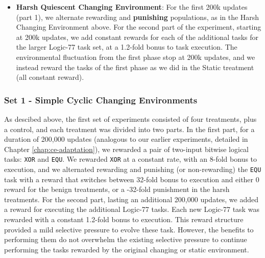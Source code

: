 \documentclass[PhD]{msu-thesis}
\begin{document}
\begin{itemize}
	\item \textbf{Harsh Quiescent Changing Environment}: For the first 200k updates (part 1), we alternate rewarding and \textbf{punishing} populations, as in the Harsh Changing Environment above. For the second part of the experiment, starting at 200k updates, we add constant rewards for each of the additional tasks for the larger Logic-77 task set, at a 1.2-fold bonus to task execution. The environmental fluctuation from the first phase stop at 200k updates, and we instead reward the tasks of the first phase as we did in the Static treatment (all constant reward).
\end{itemize}

\subsubsection{Set 1 - Simple Cyclic Changing Environments}
As descibed above, the first set of experiments consisted of four treatments, plus a control, and each treatment was divided into two parts. In the first part, for a duration of 200,000 updates (analogous to our earlier experiments, detailed in Chapter \ref{chap:ce-adaptation}), we rewarded a pair of two-input bitwise logical tasks: \texttt{XOR} and \texttt{EQU}. We rewarded \texttt{XOR} at a constant rate, with an 8-fold bonus to execution, and we alternated rewarding and punishing (or non-rewarding) the \texttt{EQU} task with a reward that switches between 32-fold bonus to execution and either 0 reward for the benign treatments, or a -32-fold punishment in the harsh treatments. For the second part, lasting an additional 200,000 updates, we added a reward for executing the additional Logic-77 tasks. Each new Logic-77 task was rewarded with a constant 1.2-fold bonus to execution. This reward structure provided a mild selective pressure to evolve these task. However, the benefits to performing them do not overwhelm the existing selective pressure to continue performing the tasks rewarded by the original changing or static environment. 
\end{document}
